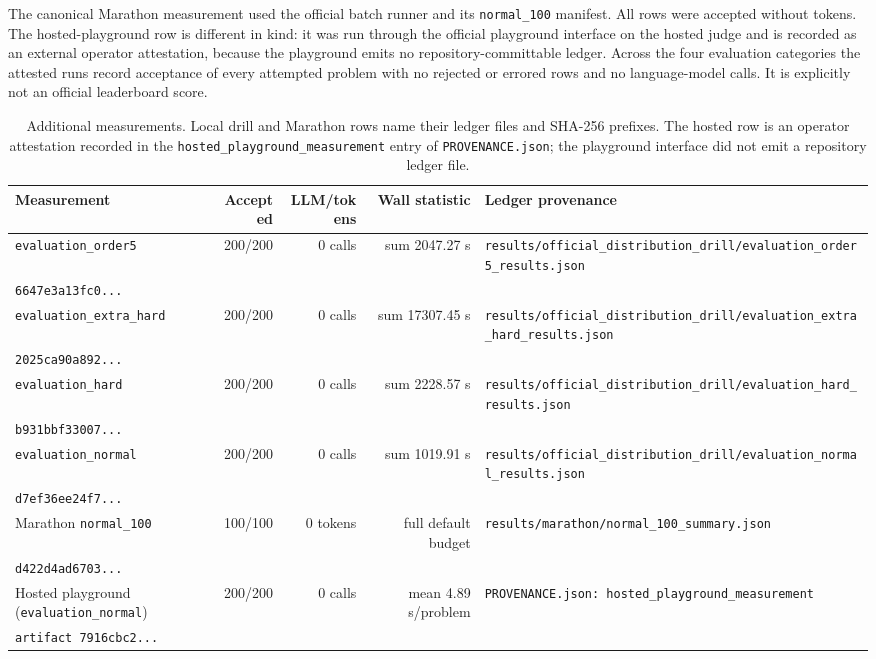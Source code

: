 \documentclass[10pt,twocolumn]{article}
\newcommand{\code}[1]{\texttt{#1}}
\newcommand{\prov}[2]{\begingroup\scriptsize\raggedright\nolinkurl{#1}\\[-1pt]\texttt{#2}\par\endgroup}
\begin{document}
The canonical Marathon measurement used the official batch runner and its
\code{normal\_100} manifest.  All rows were accepted without tokens.  The
hosted-playground row is different in kind: it was run through the official
playground interface on the hosted judge and is recorded as an external
operator attestation, because the playground emits no repository-committable
ledger.  Across the four evaluation categories the attested runs record
acceptance of every attempted problem with no rejected or errored rows and no
language-model calls.  It is explicitly not an official leaderboard score.

\begin{table}[t]
\caption{Additional measurements.  Local drill and Marathon rows name their
ledger files and SHA-256 prefixes.  The hosted row is an operator
attestation recorded in the \code{hosted\_playground\_measurement} entry of
\code{PROVENANCE.json}; the playground interface did not emit a repository
ledger file.}
\label{tab:drill}
\small
\setlength{\tabcolsep}{4pt}
\begin{tabularx}{\textwidth}{@{}lrrrY@{}}
\toprule
Measurement & Accepted & LLM/tokens & Wall statistic & Ledger provenance \\
\midrule
\code{evaluation\_order5} & 200/200 & 0 calls & sum 2047.27 s & \prov{results/official\_distribution\_drill/evaluation\_order5\_results.json}{6647e3a13fc0...} \\
\code{evaluation\_extra\_hard} & 200/200 & 0 calls & sum 17307.45 s & \prov{results/official\_distribution\_drill/evaluation\_extra\_hard\_results.json}{2025ca90a892...} \\
\code{evaluation\_hard} & 200/200 & 0 calls & sum 2228.57 s & \prov{results/official\_distribution\_drill/evaluation\_hard\_results.json}{b931bbf33007...} \\
\code{evaluation\_normal} & 200/200 & 0 calls & sum 1019.91 s & \prov{results/official\_distribution\_drill/evaluation\_normal\_results.json}{d7ef36ee24f7...} \\
Marathon \code{normal\_100} & 100/100 & 0 tokens & full default budget & \prov{results/marathon/normal\_100\_summary.json}{d422d4ad6703...} \\
Hosted playground (\code{evaluation\_normal}) & 200/200 & 0 calls & mean 4.89 s/problem & \prov{PROVENANCE.json: hosted\_playground\_measurement}{artifact 7916cbc2...} \\
\bottomrule
\end{tabularx}
\end{table}
\end{document}
